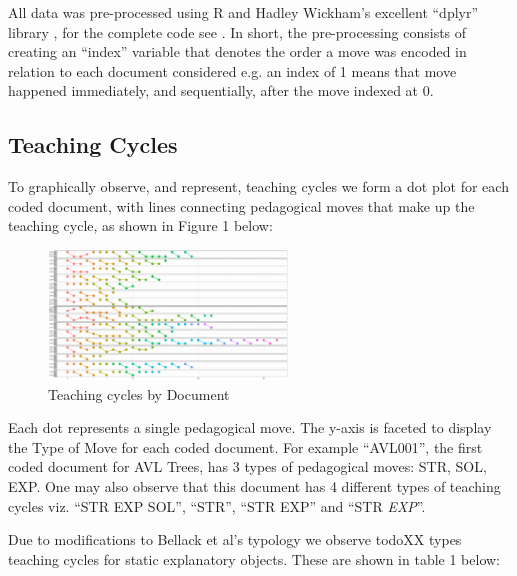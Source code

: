 \documentclass[conference]{IEEEtran}
\begin{document}
All data was pre-processed using R and Hadley Wickham's excellent ``dplyr'' library
\cite{Dplyr}, for the complete code see . In short, the pre-processing consists of creating an
``index'' variable that denotes the order a move was encoded in relation to each
document considered e.g. an index of 1 means that move happened immediately, and
sequentially, after the move indexed at 0. 

\subsection{Teaching Cycles}
To graphically observe, and represent, teaching cycles we form a dot plot for
each coded document, with lines connecting pedagogical moves that make up the
teaching cycle, as shown in Figure 1 below:

\begin{figure}[!h]
  \centering
  \includegraphics[width=2.5in]{teachCyclesPlt}
  \caption{Teaching cycles by Document}
  \label{fig:simple-empty}
\end{figure}

Each dot represents a single pedagogical move. The y-axis is faceted to display
the Type of Move for each coded document. For example ``AVL001'', the first
coded document for AVL Trees, has 3 types of pedagogical moves: STR, SOL, EXP.
One may also observe that this document has 4 different types of teaching cycles
viz. ``STR EXP SOL'', ``STR'', ``STR EXP'' and ``STR \emph{EXP}''.

Due to modifications to Bellack et al's typology we observe todo{XX} types
teaching cycles for static explanatory objects. These are shown in table 1 below:
\end{document}

